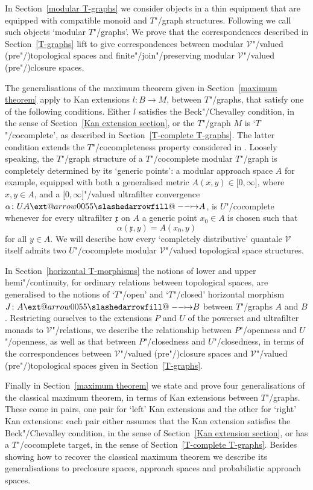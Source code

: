 \documentclass[preprint, a4paper]{elsarticle}
\makeatletter
\def\slashedarrowfill@#1#2#3#4#5{%
  $\m@th\thickmuskip0mu\medmuskip\thickmuskip\thinmuskip\thickmuskip
   \relax#5#1\mkern-7mu%
   \cleaders\hbox{$#5\mkern-2mu#2\mkern-2mu$}\hfill
   \mathclap{#3}\mathclap{#2}%
   \cleaders\hbox{$#5\mkern-2mu#2\mkern-2mu$}\hfill
   \mkern-7mu#4$%
}
\def\rightslashedarrowfill@{%
  \slashedarrowfill@\relbar\relbar\mapstochar\rightarrow}
\newcommand\xslashedrightarrow[2][]{%
  \ext@arrow 0055{\rightslashedarrowfill@}{#1}{#2}}
\def\slashedrightarrow{\xslashedrightarrow{}}
\theoremstyle{definition}
\theoremstyle{remark}
\providecommand{\secref}[1]{Section~\ref{#1}}
\providecommand{\mf}[1]{\mathfrak{#1}}
\providecommand{\brks}[1]{\lbrack #1 \rbrack}
\providecommand{\map}[3]{#1\colon#2\to#3}
\providecommand{\hmap}[3]{#1\colon#2\slashedrightarrow#3}
\providecommand{\catvar}[1]{\mathcal{#1}}
\providecommand{\2}{\mathsf 2}
\providecommand{\V}{\catvar V}
\makeatother
\begin{document}
	In \secref{modular T-graphs} we consider objects in a thin equipment that are equipped with compatible monoid and $T$"/graph structures. Following \cite{Tholen09} we call such objects `modular $T$"/graphs'. We prove that the correspondences described in \secref{T-graphs} lift to give correspondences between modular $\V$"/valued (pre"/)topological spaces and finite"/join"/preserving modular $\V$"/valued (pre"/)closure spaces.
	
	The generalisations of the maximum theorem given in \secref{maximum theorem} apply to Kan extensions $\map lBM$, between $T$"/graphs, that satisfy one of the following conditions. Either $l$ satisfies the Beck"/Chevalley condition, in the sense of \secref{Kan extension section}, or the $T$"/graph $M$ is `$T$"/cocomplete', as described in \secref{T-complete T-graphs}. The latter condition extends the $T$"/cocompleteness property considered in \cite{Hofmann-Seal-Tholen14}. Loosely speaking, the $T$"/graph structure of a $T$"/cocomplete modular $T$"/graph is completely determined by its `generic points': a modular approach space $A$ for example, equipped with both a generalised metric $A(x, y) \in \brks{0, \infty}$, where $x, y \in A$, and a $\brks{0, \infty}$"/valued ultrafilter convergence $\hmap\alpha{UA}A$, is $U$"/cocomplete whenever for every ultrafilter $\mf x$ on $A$ a generic point $x_0 \in A$ is chosen such that
	\begin{displaymath}
		\alpha(\mf x, y) = A(x_0, y)
	\end{displaymath}
	for all $y \in A$. We will describe how every `completely distributive' quantale $\V$ itself admits two $U$"/cocomplete modular $\V$"/valued topological space structures.
	
	In \secref{horizontal T-morphisms} the notions of lower and upper hemi"/continuity, for ordinary relations between topological spaces, are generalised to the notions of `$T$"/open' and `$T$"/closed' horizontal morphism $\hmap JAB$ between $T$"/graphs $A$ and $B$. Restricting ourselves to the extensions $P$ and $U$ of the powerset and ultrafilter monads to $\V$"/relations, we describe the relationship between $P$"/openness and $U$"/openness, as well as that between $P$"/closedness and $U$"/closedness, in terms of the correspondences between $\V$"/valued (pre"/)closure spaces and $\V$"/valued (pre"/)topological spaces given in \secref{T-graphs}.
	
	Finally in \secref{maximum theorem} we state and prove four generalisations of the classical maximum theorem, in terms of Kan extensions between $T$"/graphs. These come in pairs, one pair for `left' Kan extensions and the other for `right' Kan extensions: each pair either assumes that the Kan extension satisfies the Beck"/Chevalley condition, in the sense of \secref{Kan extension section}, or has a $T$"/cocomplete target, in the sense of \secref{T-complete T-graphs}. Besides showing how to recover the classical maximum theorem we describe its generalisations to preclosure spaces, approach spaces and probabilistic approach spaces.
	
\end{document}
